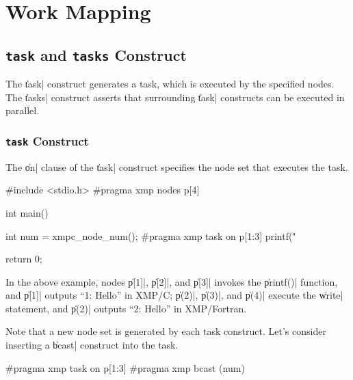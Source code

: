 \section{Work Mapping}

\subsection{{\tt task} and {\tt tasks} Construct}

The \|task| construct generates a task, which is executed by the specified
nodes. The \|tasks| construct asserts that surrounding \|task| constructs can be
executed in parallel.


\subsubsection{{\tt task} Construct}

The \|on| clause of the \|task| construct specifies the node set that
executes the task.

\begin{XCexample}
#include <stdio.h>
#pragma xmp nodes p[4]

int main(){
  int num = xmpc_node_num();
#pragma xmp task on p[1:3]
{
  printf("%
}

  return 0;
}
\end{XCexample}


In the above example, nodes \|p[1]|, \|p[2]|, and \|p[3]| invokes the \|printf()|
function, and \|p[1]| outputs ``1: Hello'' in XMP/C; \|p(2)|, \|p(3)|, and \|p(4)|
execute the \|write| statement, and \|p(2)| outputs ``2: Hello'' in
XMP/Fortran.

Note that a new node set is generated by each task construct. Let's
consider inserting a \|bcast| construct into the task.

\begin{XCexample}
#pragma xmp task on p[1:3]
{
#pragma xmp bcast (num)
}
\end{XCexample}

